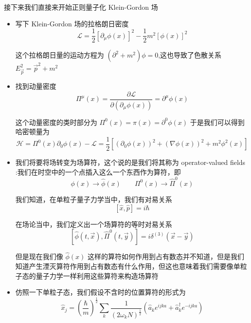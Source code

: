 接下来我们直接来开始正则量子化 Klein-Gordon 场
\begin{itemize}
    \item[Step 1] 写下 Klein-Gordon 场的拉格朗日密度
    \begin{equation*}
        \mathcal{L} = \frac{1}{2}\left[\partial_\mu \phi(x)\right]^2 - \frac{1}{2}m^2\left[\phi (x)\right]^2
    \end{equation*}

    这个拉格朗日量的运动方程为 $\displaystyle \left(\partial^2 + m^2\right)\phi = 0$,这也导致了色散关系 $\displaystyle E_{\vec{p}}^2 = \vec{p}^2 + m^2$
    \item[Step 2] 找到动量密度
    \begin{equation*}
        \Pi^\mu(x) = \frac{\partial \mathcal{L}}{\partial\left(\partial_\mu \phi(x)\right)} = \partial^\mu \phi(x)
    \end{equation*}

    这个动量密度的类时部分为 $\displaystyle \Pi^0(x) = \pi(x) = \partial^0 \phi(x)$ 于是我们可以得到哈密顿量为
    \begin{equation*}
        \mathcal{H} = \Pi^0(x)\partial_0\phi (x) - \mathcal{L} = \frac{1}{2}\left[\left(\partial_0\phi(x)\right)^2 + \left(\nabla\phi(x)\right)^2 +m^2\phi^2(x)\right]
    \end{equation*}
    \item[Step 3] 我们将要将场转变为场算符，这个说的是我们将其称为 operator-valued fields :我们在时空中的一个点插入这么一个东西作为算符，即 
    \begin{equation*}
        \phi(x) \to \hat{\phi}(x)\quad\quad \Pi^0(x) \to \hat{\Pi}^0(x)
    \end{equation*}

    我们知道，在单粒子量子力学当中，我们有对易关系
    \begin{equation*}
        \left[\hat{x},\hat{p}\right] = i\hbar
    \end{equation*}

    在场论当中，我们定义出一个场算符的等时对易关系
    \begin{equation*}
        \left[\hat{\phi}(t,\vec{x}),\hat{\Pi}^0(t,\vec{y})\right] = i\delta^{(3)}(\vec{x} - \vec{y})
    \end{equation*}

    但是现在我们像 $\hat{\phi}(x)$ 这样的算符如何作用到占有数态并不知道，但是我们知道产生湮灭算符作用到占有数态有什么作用，但这也意味着我们需要像单粒子态的量子力学一样利用这些算符来构造场算符
    \item[Step 4] 仿照一下单粒子态，我们假设不含时的位置算符的形式为
    \begin{equation*}
        \hat{x}_j = \left(\frac{\hbar}{m}\right)^\frac{1}{2} \sum_k \frac{1}{\left(2\omega_k N\right)^\frac{1}{2}}\left(\hat{a}_k e^{ijka} + \hat{a}_k^\dagger e^{-ijka}\right)
    \end{equation*}


\end{itemize}
